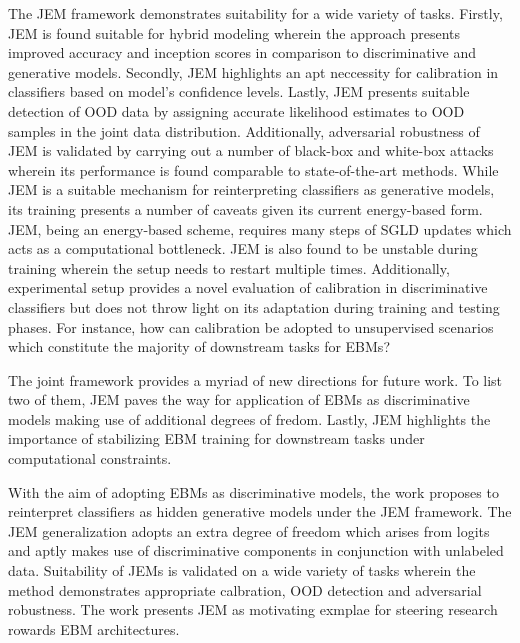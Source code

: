 \documentclass[11pt,letterpaper]{article}
\begin{document}
The JEM framework demonstrates suitability for a wide variety of tasks. Firstly, JEM is found suitable for hybrid modeling wherein the approach presents improved accuracy and inception scores in comparison to discriminative and generative models. Secondly, JEM highlights an apt neccessity for calibration in classifiers based on model's confidence levels. Lastly, JEM presents suitable detection of OOD data by assigning accurate likelihood estimates to OOD samples in the joint data distribution. Additionally, adversarial robustness of JEM is validated by carrying out a number of black-box and white-box attacks wherein its performance is found comparable to state-of-the-art methods. While JEM is a suitable mechanism for reinterpreting classifiers as generative models, its training presents a number of caveats given its current energy-based form. JEM, being an energy-based scheme, requires many steps of SGLD updates which acts as a computational bottleneck. JEM is also found to be unstable during training wherein the setup needs to restart multiple times. Additionally, experimental setup provides a novel evaluation of calibration in discriminative classifiers but does not throw light on its adaptation during training and testing phases. For instance, how can calibration be adopted to unsupervised scenarios which constitute the majority of downstream tasks for EBMs? 

The joint framework provides a myriad of new directions for future work. To list two of them, JEM paves the way for application of EBMs as discriminative models making use of additional degrees of fredom. Lastly, JEM highlights the importance of stabilizing EBM training for downstream tasks under computational constraints. 

With the aim of adopting EBMs as discriminative models, the work proposes to reinterpret classifiers as hidden generative models under the JEM framework. The JEM generalization adopts an extra degree of freedom which arises from logits and aptly makes use of discriminative components in conjunction with unlabeled data. Suitability of JEMs is validated on a wide variety of tasks wherein the method demonstrates appropriate calbration, OOD detection and adversarial robustness. The work presents JEM as motivating exmplae for steering research rowards EBM architectures. 
\end{document}
